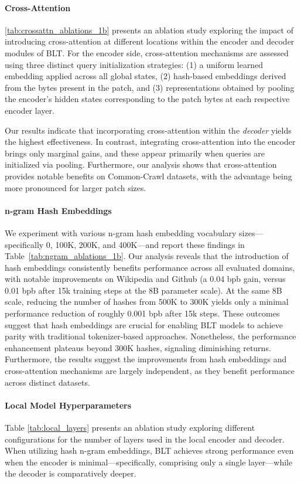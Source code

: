 \paragraph{Cross-Attention} 
\autoref{tab:crossattn_ablations_1b} presents an ablation study exploring the impact of introducing cross-attention at different locations within the encoder and decoder modules of {\textsc BLT}. For the encoder side, cross-attention mechanisms are assessed using three distinct query initialization strategies: (1) a uniform learned embedding applied across all global states, (2) hash-based embeddings derived from the bytes present in the patch, and (3) representations obtained by pooling the encoder's hidden states corresponding to the patch bytes at each respective encoder layer.

Our results indicate that incorporating cross-attention within the \textit{decoder} yields the highest effectiveness. In contrast, integrating cross-attention into the encoder brings only marginal gains, and these appear primarily when queries are initialized via pooling. Furthermore, our analysis shows that cross-attention provides notable benefits on Common-Crawl datasets, with the advantage being more pronounced for larger patch sizes.

\paragraph{n-gram Hash Embeddings} 

We experiment with various n-gram hash embedding vocabulary sizes—specifically 0, 100K, 200K, and 400K—and report these findings in Table~\ref{tab:ngram_ablations_1b}. Our analysis reveals that the introduction of hash embeddings consistently benefits performance across all evaluated domains, with notable improvements on Wikipedia and Github (a 0.04 bpb gain, versus 0.01 bpb after 15k training steps at the 8B parameter scale). At the same 8B scale, reducing the number of hashes from 500K to 300K yields only a minimal performance reduction of roughly 0.001 bpb after 15k steps. These outcomes suggest that hash embeddings are crucial for enabling {\textsc BLT} models to achieve parity with traditional tokenizer-based approaches. Nonetheless, the performance enhancement plateaus beyond 300K hashes, signaling diminishing returns. Furthermore, the results suggest the improvements from hash embeddings and cross-attention mechanisms are largely independent, as they benefit performance across distinct datasets.

\paragraph{Local Model Hyperparameters} Table \ref{tab:local_layers} presents an ablation study exploring different configurations for the number of layers used in the local encoder and decoder. When utilizing hash n-gram embeddings, {\textsc BLT} achieves strong performance even when the encoder is minimal—specifically, comprising only a single layer—while the decoder is comparatively deeper.

